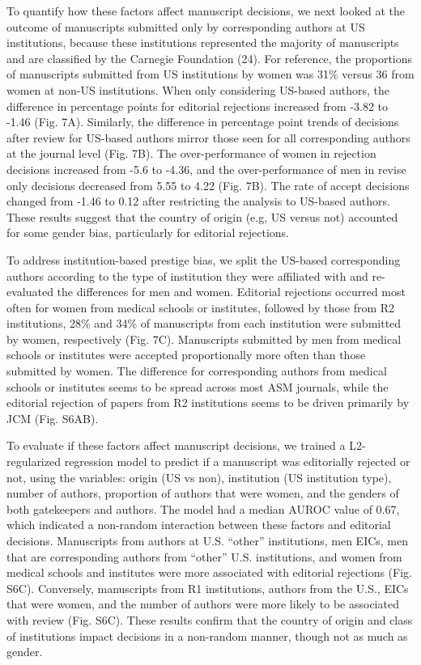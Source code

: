\documentclass[11pt,]{article}
\begin{document}
To quantify how these factors affect manuscript decisions, we next
looked at the outcome of manuscripts submitted only by corresponding
authors at US institutions, because these institutions represented the
majority of manuscripts and are classified by the Carnegie Foundation
(24). For reference, the proportions of manuscripts submitted from US
institutions by women was 31\% versus 36 from women at non-US
institutions. When only considering US-based authors, the difference in
percentage points for editorial rejections increased from -3.82 to -1.46
(Fig. 7A). Similarly, the difference in percentage point trends of
decisions after review for US-based authors mirror those seen for all
corresponding authors at the journal level (Fig. 7B). The
over-performance of women in rejection decisions increased from -5.6 to
-4.36, and the over-performance of men in revise only decisions
decreased from 5.55 to 4.22 (Fig. 7B). The rate of accept decisions
changed from -1.46 to 0.12 after restricting the analysis to US-based
authors. These results suggest that the country of origin (e.g, US
versus not) accounted for some gender bias, particularly for editorial
rejections.

To address institution-based prestige bias, we split the US-based
corresponding authors according to the type of institution they were
affiliated with and re-evaluated the differences for men and women.
Editorial rejections occurred most often for women from medical schools
or institutes, followed by those from R2 institutions, 28\% and 34\% of
manuscripts from each institution were submitted by women, respectively
(Fig. 7C). Manuscripts submitted by men from medical schools or
institutes were accepted proportionally more often than those submitted
by women. The difference for corresponding authors from medical schools
or institutes seems to be spread across most ASM journals, while the
editorial rejection of papers from R2 institutions seems to be driven
primarily by JCM (Fig. S6AB).

To evaluate if these factors affect manuscript decisions, we trained a
L2-regularized regression model to predict if a manuscript was
editorially rejected or not, using the variables: origin (US vs non),
institution (US institution type), number of authors, proportion of
authors that were women, and the genders of both gatekeepers and
authors. The model had a median AUROC value of 0.67, which indicated a
non-random interaction between these factors and editorial decisions.
Manuscripts from authors at U.S. ``other'' institutions, men EICs, men
that are corresponding authors from ``other'' U.S. institutions, and
women from medical schools and institutes were more associated with
editorial rejections (Fig. S6C). Conversely, manuscripts from R1
institutions, authors from the U.S., EICs that were women, and the
number of authors were more likely to be associated with review (Fig.
S6C). These results confirm that the country of origin and class of
institutions impact decisions in a non-random manner, though not as much
as gender.
\end{document}
